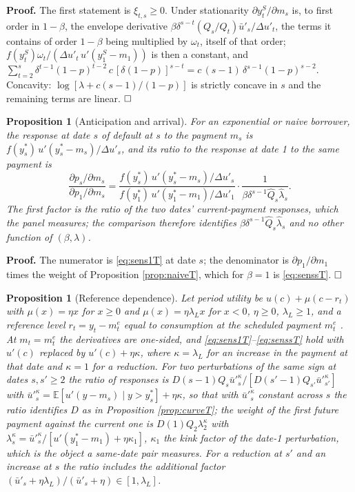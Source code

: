 \documentclass[12pt,english]{article}
\newtheorem{proposition}[theorem]{Proposition}
\begin{document}
\noindent\textbf{Proof.} The first statement is $\xi_{t,s} \ge 0$. Under stationarity $\partial y^S_t/\partial m_s$ is, to first order in $1-\beta$, the envelope derivative $\beta\delta^{s-t}(Q_s/Q_t)\bar u'_s/\Delta u'_t$, the terms it contains of order $1-\beta$ being multiplied by $\omega_t$, itself of that order; $f(y^S_t)\omega_t/(\Delta u'_t\,u'(y^S_1 - m_1))$ is then a constant, and $\sum_{t=2}^{s}\delta^{t-1}(1-p)^{t-2}\,c\,[\delta(1-p)]^{s-t} = c\,(s-1)\,\delta^{s-1}(1-p)^{s-2}$. Concavity: $\log[\lambda + c(s-1)/(1-p)]$ is strictly concave in $s$ and the remaining terms are linear. $\hfill\square$

\begin{proposition}[Anticipation and arrival]\label{prop:arrival}
For an exponential or naive borrower, the response at date $s$ of default at $s$ to the payment $m_s$ is $f(y^*_s)\,u'(y^*_s - m_s)/\Delta u'_s$, and its ratio to the response at date 1 to the same payment is
\[
\frac{\partial p_s/\partial m_s}{\partial p_1/\partial m_s} = \frac{f(y^*_s)\,u'(y^*_s - m_s)/\Delta u'_s}{f(y^*_1)\,u'(y^*_1 - m_1)/\Delta u'_1}\cdot\frac{1}{\beta\delta^{s-1}\hat Q_s\hat\lambda_s} .
\]
The first factor is the ratio of the two dates' current-payment responses, which the panel measures; the comparison therefore identifies $\beta\delta^{s-1}\hat Q_s\hat\lambda_s$ and no other function of $(\beta, \lambda)$.
\end{proposition}

\noindent\textbf{Proof.} The numerator is \eqref{eq:sens1T} at date $s$; the denominator is $\partial p_1/\partial m_1$ times the weight of Proposition \ref{prop:naiveT}, which for $\beta = 1$ is \eqref{eq:senssT}. $\hfill\square$

\begin{proposition}[Reference dependence]\label{prop:refdep}
Let period utility be $u(c) + \mu(c - r_t)$ with $\mu(x) = \eta x$ for $x \ge 0$ and $\mu(x) = \eta\lambda_L x$ for $x < 0$, $\eta \ge 0$, $\lambda_L \ge 1$, and a reference level $r_t = y_t - m^e_t$ equal to consumption at the scheduled payment $m^e_t$ \citep{koszegi_model_2006}. At $m_t = m^e_t$ the derivatives are one-sided, and \eqref{eq:sens1T}--\eqref{eq:senssT} hold with $u'(c)$ replaced by $u'(c) + \eta\kappa$, where $\kappa = \lambda_L$ for an increase in the payment at that date and $\kappa = 1$ for a reduction. For two perturbations of the same sign at dates $s, s' \ge 2$ the ratio of responses is $D(s-1)Q_s\bar u'^{\kappa}_s/[D(s'-1)Q_{s'}\bar u'^{\kappa}_{s'}]$ with $\bar u'^{\kappa}_s = \mathbb{E}[u'(y - m_s) \mid y > y^*_s] + \eta\kappa$, so that with $\bar u'^\kappa_s$ constant across $s$ the ratio identifies $D$ as in Proposition \ref{prop:curveT}; the weight of the first future payment against the current one is $D(1)Q_2\lambda^\kappa_2$ with $\lambda^\kappa_s = \bar u'^{\kappa}_s/[u'(y^*_1 - m_1) + \eta\kappa_1]$, $\kappa_1$ the kink factor of the date-1 perturbation, which is the object a same-date pair measures. For a reduction at $s'$ and an increase at $s$ the ratio includes the additional factor $(\bar u'_s + \eta\lambda_L)/(\bar u'_s + \eta) \in [1, \lambda_L]$.
\end{proposition}
\end{document}
